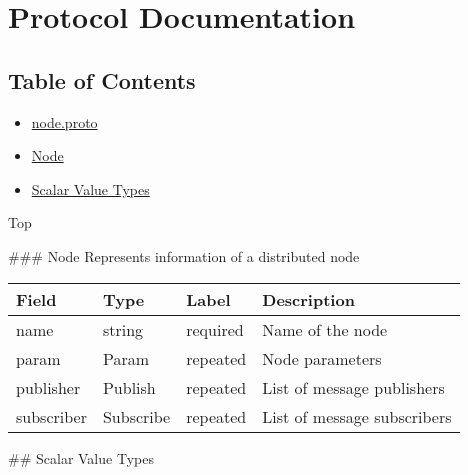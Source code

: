 \section{Protocol Documentation}\label{protocol-documentation}

\subsection{Table of Contents}\label{table-of-contents}

\begin{itemize}
\item
  \hyperref[node.proto]{node.proto}
\item
  \hyperref[experimot.msgs.Node]{Node}
\item
  \hyperref[scalar-value-types]{Scalar Value Types}
\end{itemize}

Top


 \#\#\# Node Represents information of a distributed node

\begin{longtable}[c]{@{}llll@{}}
\toprule
Field & Type & Label & Description\tabularnewline
\midrule
\endhead
name & string & required & Name of the node\tabularnewline
param & Param & repeated & Node parameters\tabularnewline
publisher & Publish & repeated & List of message
publishers\tabularnewline
subscriber & Subscribe & repeated & List of message
subscribers\tabularnewline
\bottomrule
\end{longtable}

 \#\# Scalar Value Types

